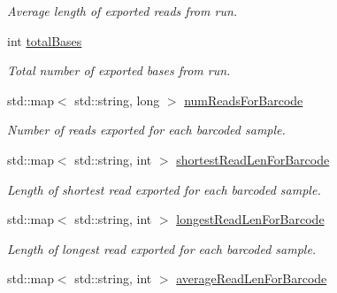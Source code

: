 \begin{DoxyCompactItemize}
\begin{DoxyCompactList}\small\item\em Average length of exported reads from run. \end{DoxyCompactList}\item 
\hypertarget{structTorrentReadStatsBundle_aa31ec9f597594875ada109a0c4d6afb7}{int \hyperlink{structTorrentReadStatsBundle_aa31ec9f597594875ada109a0c4d6afb7}{total\-Bases}}\label{structTorrentReadStatsBundle_aa31ec9f597594875ada109a0c4d6afb7}

\begin{DoxyCompactList}\small\item\em Total number of exported bases from run. \end{DoxyCompactList}\item 
\hypertarget{structTorrentReadStatsBundle_a570d23081e339c95a30cd8d9476f4919}{std\-::map$<$ std\-::string, long $>$ \hyperlink{structTorrentReadStatsBundle_a570d23081e339c95a30cd8d9476f4919}{num\-Reads\-For\-Barcode}}\label{structTorrentReadStatsBundle_a570d23081e339c95a30cd8d9476f4919}

\begin{DoxyCompactList}\small\item\em Number of reads exported for each barcoded sample. \end{DoxyCompactList}\item 
\hypertarget{structTorrentReadStatsBundle_a7a17b748a3147d2c92ad62d59732f672}{std\-::map$<$ std\-::string, int $>$ \hyperlink{structTorrentReadStatsBundle_a7a17b748a3147d2c92ad62d59732f672}{shortest\-Read\-Len\-For\-Barcode}}\label{structTorrentReadStatsBundle_a7a17b748a3147d2c92ad62d59732f672}

\begin{DoxyCompactList}\small\item\em Length of shortest read exported for each barcoded sample. \end{DoxyCompactList}\item 
\hypertarget{structTorrentReadStatsBundle_a00f7ed03af6f4c72c21cd5e9e4edff4b}{std\-::map$<$ std\-::string, int $>$ \hyperlink{structTorrentReadStatsBundle_a00f7ed03af6f4c72c21cd5e9e4edff4b}{longest\-Read\-Len\-For\-Barcode}}\label{structTorrentReadStatsBundle_a00f7ed03af6f4c72c21cd5e9e4edff4b}

\begin{DoxyCompactList}\small\item\em Length of longest read exported for each barcoded sample. \end{DoxyCompactList}\item 
\hypertarget{structTorrentReadStatsBundle_a9fdf483a6f4ef91a3340131c050a45ac}{std\-::map$<$ std\-::string, int $>$ \hyperlink{structTorrentReadStatsBundle_a9fdf483a6f4ef91a3340131c050a45ac}{average\-Read\-Len\-For\-Barcode}}\label{structTorrentReadStatsBundle_a9fdf483a6f4ef91a3340131c050a45ac}


\end{DoxyCompactItemize}
